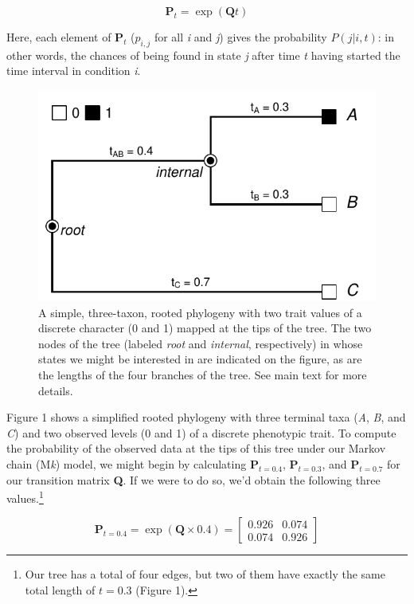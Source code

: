 \documentclass{article}
\begin{document}
\[\mathbf{P}_t = \exp(\mathbf{Q}t)\]

Here, each element of \(\mathbf{P}_t\) (\(p_{i,j}\) for all \emph{i} and \emph{j}) gives the probability \(P(j|i,t)\): in other words, the chances of being found in state \emph{j} after time \emph{t} having started the time interval in condition \emph{i}.

\begin{figure}
\centering
\includegraphics{Revell.AncestralReconstruction_files/figure-latex/fig1-1.pdf}
\caption{\label{fig:fig1}A simple, three-taxon, rooted phylogeny with two trait values of a discrete character (0 and 1) mapped at the tips of the tree. The two nodes of the tree (labeled \emph{root} and \emph{internal}, respectively) in whose states we might be interested in are indicated on the figure, as are the lengths of the four branches of the tree. See main text for more details.}
\end{figure}

Figure 1 shows a simplified rooted phylogeny with three terminal taxa (\emph{A}, \emph{B}, and \emph{C}) and two observed levels (0 and 1) of a discrete phenotypic trait. To compute the probability of the observed data at the tips of this tree under our Markov chain (M\emph{k}) model, we might begin by calculating \(\mathbf{P}_{t=0.4}\), \(\mathbf{P}_{t=0.3}\), and \(\mathbf{P}_{t=0.7}\) for our transition matrix \textbf{Q}. If we were to do so, we'd obtain the following three values.\footnote{Our tree has a total of four edges, but two of them have exactly the same total length of $t = 0.3$ (Figure 1).}

\[\mathbf{P}_{t=0.4} = \exp({\mathbf{Q} \times 0.4}) = \begin{bmatrix}0.926 & 0.074\\0.074 & 0.926\end{bmatrix}\]
\end{document}
